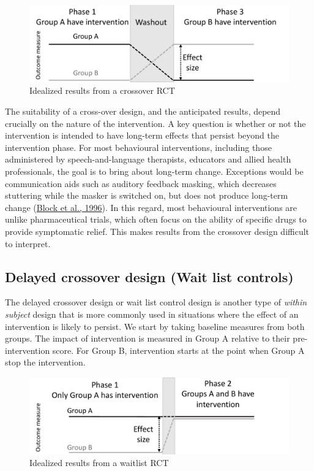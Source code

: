 \documentclass{krantz}
\begin{document}
\begin{center}
\begin{figure}
\includegraphics[width=0.75\linewidth]{images_bw/crossover} \caption{Idealized results from a crossover RCT}\label{fig:crossoverplot}
\end{figure}
\end{center}

The suitability of a cross-over design, and the anticipated results, depend crucially on the nature of the intervention. A key question is whether or not the intervention is intended to have long-term effects that persist beyond the intervention phase. For most behavioural interventions, including those administered by speech-and-language therapists, educators and allied health professionals, the goal is to bring about long-term change. Exceptions would be communication aids such as auditory feedback masking, which decreases stuttering while the masker is switched on, but does not produce long-term change (\protect\hyperlink{ref-block1996}{Block et al., 1996}). In this regard, most behavioural interventions are unlike pharmaceutical trials, which often focus on the ability of specific drugs to provide symptomatic relief. This makes results from the crossover design difficult to interpret.

\hypertarget{delayed-crossover-design-wait-list-controls}{%
\subsection{Delayed crossover design (Wait list controls)}\label{delayed-crossover-design-wait-list-controls}}

The delayed crossover design or wait list control design is another type of \emph{within subject} design that is more commonly used in situations where the effect of an intervention is likely to persist. We start by taking baseline measures from both groups. The impact of intervention is measured in Group A relative to their pre-intervention score. For Group B, intervention starts at the point when Group A stop the intervention.

\begin{center}
\begin{figure}
\includegraphics[width=0.75\linewidth]{images_bw/waitlist} \caption{Idealized results from a waitlist RCT}\label{fig:waitlist-plot}
\end{figure}
\end{center}
\end{document}
